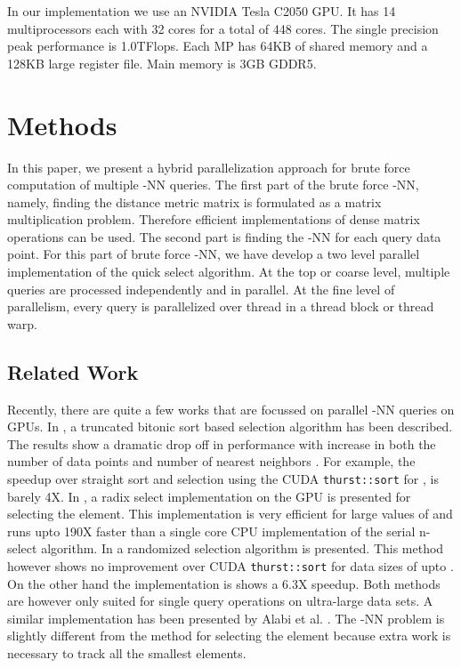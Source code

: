 \documentclass[10pt]{article}
\begin{document}
In our implementation we use an NVIDIA Tesla C2050 GPU. It has 14 multiprocessors each with 32 cores for a total of 448 cores. The single precision peak performance is 1.0TFlops. Each MP has 64KB of shared memory and a 128KB large register file. Main memory is 3GB GDDR5. 


\section*{Methods}
In this paper, we present a hybrid parallelization approach for brute force computation of multiple -NN queries. The first part of the brute force -NN, namely, finding the distance metric matrix is formulated as a matrix multiplication problem. Therefore efficient implementations of dense matrix operations can be used. The second part is finding the -NN for each query data point.  For this part of brute force -NN, we have develop a two level parallel implementation of the quick select algorithm. At the top or coarse level, multiple queries are processed independently and in parallel. At the fine level of parallelism, every query is parallelized over thread in a thread block or thread warp. \\





\subsection*{Related Work}
Recently, there are quite a few works that are focussed on parallel -NN queries on GPUs. In \cite{Sismanis:2012}, a truncated bitonic sort based selection algorithm has been described. The results show a dramatic drop off in performance with increase in both  the number of data points  and number of nearest neighbors . For example, the speedup over straight sort and selection using the CUDA \texttt{thurst::sort} for , is barely 4X. In \cite{Baxter:2011}, a radix select implementation on the GPU is presented for selecting the  element. This implementation is very efficient for large values of  and runs upto 190X faster than a single core CPU implementation of the serial n-select algorithm. In \cite{Monroe:2011} a randomized selection algorithm is presented. This method however shows no improvement over CUDA \texttt{thurst::sort} for data sizes of upto . On the other hand the implementation is \cite{Baxter:2011} shows a 6.3X speedup. Both methods are however only suited for single query operations on ultra-large data sets. A similar implementation has been presented by  Alabi et al. \cite{Alabi:2012}.  The -NN problem is slightly different from the method for selecting the  element because extra work is necessary to track all the  smallest elements. \\
\end{document}
